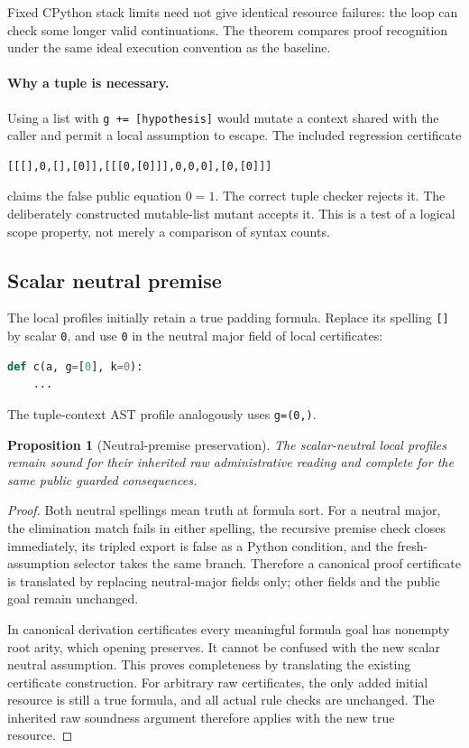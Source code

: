 \documentclass[11pt,letterpaper]{article}
\newtheorem{proposition}[theorem]{Proposition}
\theoremstyle{definition}\newtheorem{definition}[theorem]{Definition}
\theoremstyle{remark}\newtheorem{remark}[theorem]{Remark}
\begin{document}
Fixed CPython stack limits need not give identical resource failures: the
loop can check some longer valid continuations. The theorem compares proof
recognition under the same ideal execution convention as the baseline.

\paragraph{Why a tuple is necessary.}
Using a list with \texttt{g += [hypothesis]} would mutate a context shared
with the caller and permit a local assumption to escape. The included
regression certificate
\begin{lstlisting}[language={}]
[[[],0,[],[0]],[[[0,[0]]],0,0,0],[0,[0]]]
\end{lstlisting}
claims the false public equation $0=1$. The correct tuple checker rejects
it. The deliberately constructed mutable-list mutant accepts it. This is a
test of a logical scope property, not merely a comparison of syntax counts.

\subsection{Scalar neutral premise}

The local profiles initially retain a true padding formula. Replace its
spelling \texttt{[]} by scalar \texttt{0}, and use \texttt{0} in the neutral
major field of local certificates:
\begin{lstlisting}[language=Python]
def c(a, g=[0], k=0):
    ...
\end{lstlisting}
The tuple-context AST profile analogously uses \texttt{g=(0,)}.

\begin{proposition}[Neutral-premise preservation]
The scalar-neutral local profiles remain sound for their inherited raw
administrative reading and complete for the same public guarded
consequences.
\end{proposition}
\begin{proof}
Both neutral spellings mean truth at formula sort. For a neutral major,
the elimination match fails in either spelling, the recursive premise check
closes immediately, its tripled export is false as a Python condition, and
the fresh-assumption selector takes the same branch. Therefore a canonical
proof certificate is translated by replacing neutral-major fields only;
other fields and the public goal remain unchanged.

In canonical derivation certificates every meaningful formula goal has
nonempty root arity, which opening preserves. It cannot be confused with
the new scalar neutral assumption. This proves completeness by translating
the existing certificate construction. For arbitrary raw certificates,
the only added initial resource is still a true formula, and all actual
rule checks are unchanged. The inherited raw soundness argument therefore
applies with the new true resource.
\end{proof}
\end{document}
